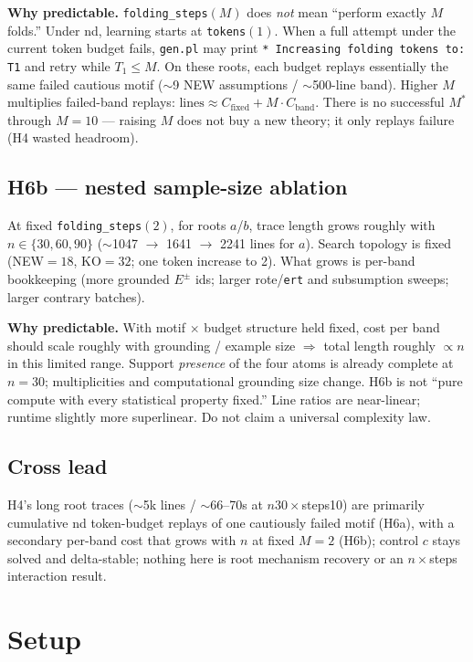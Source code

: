 \documentclass[11pt]{article}
\begin{document}
\textbf{Why predictable.}
\texttt{folding\_steps}$(M)$ does \emph{not} mean ``perform exactly $M$ folds.''
Under nd, learning starts at \texttt{tokens}$(1)$.
When a full attempt under the current token budget fails, \texttt{gen.pl} may
print \texttt{* Increasing folding tokens to: T1} and retry while $T_1\le M$.
On these roots, each budget replays essentially the same failed cautious motif
($\sim$9 NEW assumptions / $\sim$500-line band).
Higher $M$ multiplies failed-band replays:
$\mathrm{lines}\approx C_{\mathrm{fixed}}+M\cdot C_{\mathrm{band}}$.
There is no successful $M^*$ through $M{=}10$ --- raising $M$ does not buy a
new theory; it only replays failure (H4 wasted headroom).

\subsection{H6b --- nested sample-size ablation}

At fixed \texttt{folding\_steps}$(2)$, for roots $a$/$b$, trace length grows
roughly with $n\in\{30,60,90\}$ ($\sim$1047 $\to$ 1641 $\to$ 2241 lines for $a$).
Search topology is fixed (NEW${=}18$, KO${=}32$; one token increase to 2).
What grows is per-band bookkeeping (more grounded $E^\pm$ ids; larger
rote/\texttt{ert} and subsumption sweeps; larger contrary batches).

\textbf{Why predictable.}
With motif $\times$ budget structure held fixed, cost per band should scale
roughly with grounding / example size $\Rightarrow$ total length roughly
$\propto n$ in this limited range.
Support \emph{presence} of the four atoms is already complete at $n{=}30$;
multiplicities and computational grounding size change.
H6b is not ``pure compute with every statistical property fixed.''
Line ratios are near-linear; runtime slightly more superlinear.
Do not claim a universal complexity law.

\subsection{Cross lead}

H4's long root traces ($\sim$5k lines / $\sim$66--70s at $n30\times$steps10)
are primarily cumulative nd token-budget replays of one cautiously failed motif
(H6a), with a secondary per-band cost that grows with $n$ at fixed $M{=}2$
(H6b); control $c$ stays solved and delta-stable; nothing here is root
mechanism recovery or an $n\times$steps interaction result.

\section{Setup}
\end{document}
